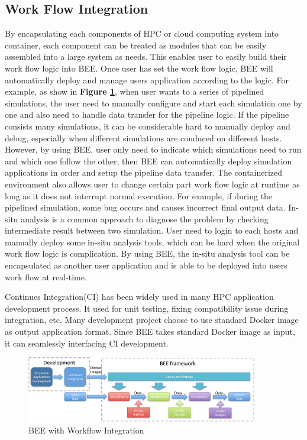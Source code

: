 \subsection{Work Flow Integration}
By encapsulating each components of HPC or cloud computing system into container, each component can be treated as modules that can be easily assembled into a large system as needs. This enables user to easily build their work flow logic into BEE. Once user has set the work flow logic, BEE will automatically deploy and manage users application according to the logic. For example, as show in \textbf{Figure \ref{workflow}}, when user wants to a series of pipelined simulations, the user need to manually configure and start each simulation one by one and also need to handle data transfer for the pipeline logic. If the pipeline consists many simulations, it can be considerable hard to manually deploy and debug, especially when different simulations are conduced on different hosts. However, by using BEE, user only need to indicate which simulations need to run and which one follow the other, then BEE can automatically deploy simulation applications in order and setup the pipeline data transfer. The containerized environment also allows user to change certain part work flow logic at runtime as long as it does not interrupt normal execution. For example, if during the pipelined simulation, some bug occurs and causes incorrect final output data. In-situ analysis is a common approach to diagnose the problem by checking intermediate result between two simulation. User need to login to each hosts and manually deploy some in-situ analysis tools, which can be hard when the original work flow logic is complication. By using BEE, the in-situ analysis tool can be encapsulated as another user application and is able to be deployed into users work flow at real-time.

Continues Integration(CI) has been widely used in many HPC application development process. It used for unit testing, fixing compatibility issue during integration, etc. Many development project choose to use standard Docker image as output application format. Since BEE takes standard Docker image as input, it can seamlessly interfacing CI development.
\begin{figure}[h]
    \centering
    \caption{BEE with Workflow Integration}
    \label{workflow}
    \includegraphics[width=0.9\textwidth]{figures/workflow.pdf}
\end{figure}


